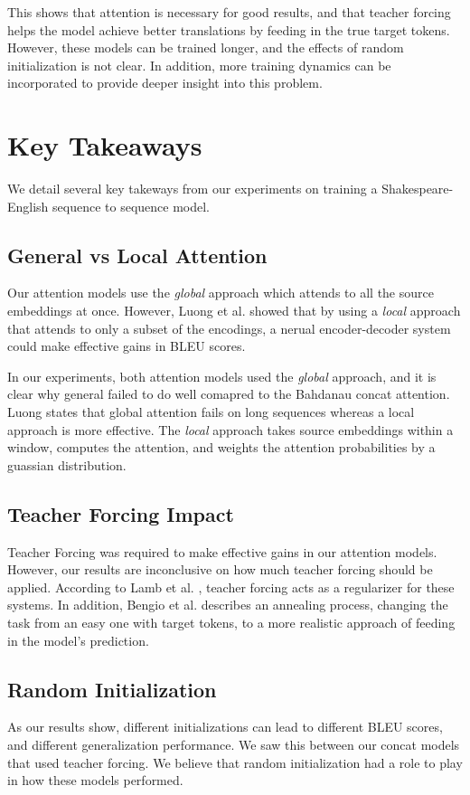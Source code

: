 \documentclass[twoside,twocolumn]{article}
\begin{document}
This shows that attention is necessary for good results, and that teacher
forcing helps the model achieve better translations by feeding in the true
target tokens. However, these models can be trained longer, and the effects
of random initialization is not clear. In addition, more training dynamics can
be incorporated to provide deeper insight into this problem.

\section{Key Takeaways}
\label{sec:key-takeaway}
We detail several key takeways from our experiments on training a
Shakespeare-English sequence to sequence model.
\subsection{General vs Local Attention}
\label{sec:key-attention}
Our attention models use the \emph{global} approach which attends to all the
source embeddings at once. However, Luong et al. \cite{luong2015effective}
showed that by using a \emph{local} approach that attends to only a subset
of the encodings, a nerual encoder-decoder system could make effective gains in
BLEU scores.

In our experiments, both attention models used the \emph{global} approach, and
it is clear why general failed to do well comapred to the Bahdanau concat
attention. Luong states that global attention fails on long sequences whereas
a local approach is more effective. The \emph{local} approach takes
source embeddings within a window, computes the attention, and weights the
attention probabilities by a guassian distribution.
\subsection{Teacher Forcing Impact}
Teacher Forcing was required to make effective gains in our attention models.
However, our results are inconclusive on how much teacher forcing should be
applied. According to Lamb et al. \cite{lamb2016professor}, teacher forcing
acts as a regularizer for these systems. In addition, Bengio et al.
\cite{DBLP:journals/corr/BengioVJS15} describes an annealing
process, changing the task from an easy one with target tokens, to a more
realistic approach of feeding in the model's prediction.

\subsection{Random Initialization}
As our results show, different initializations can lead to different BLEU
scores, and different generalization performance. We saw this between our
concat models that used teacher forcing. We believe that random initialization
had a role to play in how these models performed.
\end{document}
